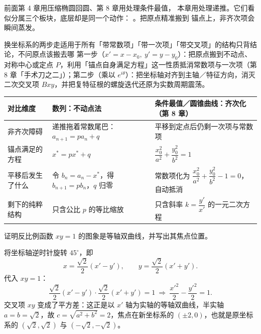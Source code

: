 前面第 4 章用压缩椭圆回圆、第 8 章用处理条件最值，
本章用处理递推。它们看似分属三个板块，底层却是同一个动作：
。把原点精准搬到
锚点上，非齐次项会瞬间蒸发。

\begin{conccard}[二级]{换坐标系的两步走}{适用于所有「带常数项」「带一次项」「带交叉项」的结构}{只背结论，不问原点该搬去哪}
第一步（$x'=x-x_0,\ y'=y-y_0$）：把原点搬到不动点、对称中心或定点 $P$，利用「锚点自身满足方程」这一性质抵消常数项与一次项（第 8 章「手术刀之二」）；第二步（乘以 $e^{i\theta}$）：把坐标轴对齐到主轴／特征方向，消灭二次交叉项 $Bxy$，并把复特征根的螺旋迭代还原为实数周期震荡。
\end{conccard}

\begin{center}
\renewcommand{\arraystretch}{1.4}
\begin{tabular}{|p{2.8cm}|p{5.0cm}|p{5.4cm}|}
\hline
\textbf{对比维度} & \textbf{数列：不动点法} & \textbf{条件最值／圆锥曲线：齐次化（第 8 章）} \\
\hline
非齐次障碍 & 递推拖着常数尾巴：$a_{n+1}=pa_n+q$ & 平移到定点后仍剩一次项与常数项 \\
\hline
锚点满足的方程 & $x^*=px^*+q$ & $\dfrac{x_0^2}{a^2}+\dfrac{y_0^2}{b^2}=1$ \\
\hline
平移后发生了什么 & 令 $b_n=a_n-x^*$，得 $b_{n+1}=pb_n$，$q$ 归零 & 常数项化为 $\dfrac{x_0^2}{a^2}+\dfrac{y_0^2}{b^2}-1=0$，自动抵消 \\
\hline
剩下的纯粹结构 & 只含公比 $p$ 的等比缩放 & 只含斜率 $k=\dfrac{y'}{x'}$ 的一元二次方程 \\
\hline
\end{tabular}
\end{center}

\begin{problem}[旋转 $45^\circ$：把 $xy=1$ 还原成标准双曲线]
证明反比例函数 $xy=1$ 的图象是等轴双曲线，并写出其焦点位置。
\end{problem}
\begin{solution}
将坐标轴逆时针旋转 $45^\circ$，即
\[
  x=\frac{\sqrt2}{2}(x'-y'),\qquad y=\frac{\sqrt2}{2}(x'+y') .
\]
代入 $xy=1$：
\[
  \frac{\sqrt2}{2}(x'-y')\cdot\frac{\sqrt2}{2}(x'+y')=1
  \ \Longrightarrow\
  \frac{x'^2}{2}-\frac{y'^2}{2}=1 .
\]
交叉项 $xy$ 变成了平方差：这正是以 $x'$ 轴为实轴的等轴双曲线，半实轴 $a=b=\sqrt2$，故 $c=\sqrt{a^2+b^2}=2$，焦点在新坐标系的 $(\pm2,0)$，也就是原坐标系的 $(\sqrt2,\sqrt2)$ 与 $(-\sqrt2,-\sqrt2)$。
\end{solution}

